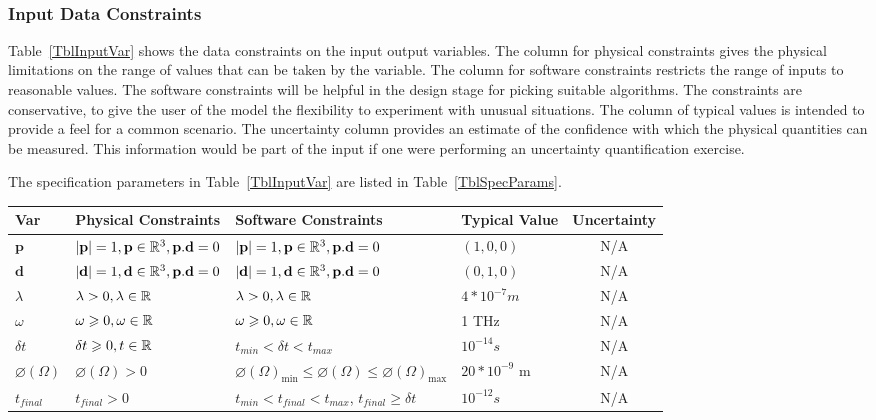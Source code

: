 \documentclass[12pt]{article}
\begin{document}
	~\newline
	
	

	
	
	\subsubsection{Input Data Constraints} \label{sec_DataConstraints}
	
	Table~\ref{TblInputVar} shows the data constraints on the input output
	variables.  The column for physical constraints gives the physical limitations
	on the range of values that can be taken by the variable.  The column for
	software constraints restricts the range of inputs to reasonable values.  The
	software constraints will be helpful in the design stage for picking suitable
	algorithms.  The constraints are conservative, to give the user of the model the
	flexibility to experiment with unusual situations.  The column of typical values
	is intended to provide a feel for a common scenario.  The uncertainty column
	provides an estimate of the confidence with which the physical quantities can be
	measured.  This information would be part of the input if one were performing an
	uncertainty quantification exercise.
	
	The specification parameters in Table~\ref{TblInputVar} are listed in
	Table~\ref{TblSpecParams}.
	
	\begin{table}[!h] \caption{Input Variables} \label{TblInputVar} \renewcommand{\arraystretch}{1.2} \noindent \begin{longtable*}{l l l l c} \toprule \textbf{Var} & \textbf{Physical Constraints} & \textbf{Software Constraints} & \textbf{Typical Value} & Uncertainty\\ \midrule 
			$\textbf{p}$ & $|\textbf{p}|=1,  \textbf{p} \in \Bbb R^{3} , \textbf{p}.\textbf{d}=0$ & $|\textbf{p}|=1, \textbf{p} \in \Bbb R^{3}, \textbf{p}.\textbf{d}=0$ & $(1,0,0)$ & N/A \\
			$\textbf{d}$ & $|\textbf{d}|=1,  \textbf{d} \in \Bbb R^{3}, \textbf{p}.\textbf{d}=0$ & $|\textbf{d}|=1, \textbf{d} \in \Bbb R^{3}, \textbf{p}.\textbf{d}=0$ & $(0,1,0)$& N/A\\
			$\lambda$ & $\lambda>0,  \lambda \in \Bbb R$ & $\lambda>0, \lambda \in \Bbb R$ & $4 * 10^{-7} m$& N/A\\	 
			$\omega$ & $\omega \geqslant 0, \omega \in \Bbb R$ & $\omega \geqslant 0, \omega \in \Bbb R$ & 1 THz & N/A\\ 
			$\delta t$ & $\delta t \geqslant 0, t \in \Bbb R$ &  $t_{min} < \delta t < t_{max}$ & $10^{-14} s$ & N/A\\
			$\varnothing(\Omega)$ & $\varnothing(\Omega) > 0$ & $\varnothing(\Omega)_{\text{min}} \leq \varnothing(\Omega) \leq \varnothing(\Omega)_{\text{max}}$ & $20*10^{-9}$ \si[per-mode=symbol] {\metre} & N/A \\ 
			$t_{final}$ & $t_{final}>0$ &   $t_{min} < t_{final} < t_{max}$, $t_{final} \geqslant \delta t$ & $10^{-12} s$ & N/A\\
			 \bottomrule \end{longtable*} \end{table}
\end{document}

